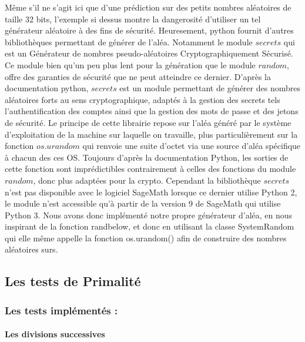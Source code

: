 \documentclass[a4paper,11pt]{article}
\begin{document}
Même s'il ne s'agit ici que d'une prédiction sur des petits nombres aléatoires de taille 32 bits, l'exemple si dessus montre la dangerosité d'utiliser un tel générateur aléatoire à des fins de sécurité. Heuresement, python fournit d'autres bibliothèques permettant de générer de l'aléa. Notamment le module $secrets$ qui est un Générateur de nombres pseudo-aléatoires Cryptographiquement Sécurisé. Ce module bien qu'un peu plus lent pour la génération que le module $random$, offre des garanties de sécurité que ne peut atteindre ce dernier.  
D'après la documentation python, $secrets$ est un module permettant de générer des nombres aléatoires forts au sens cryptographique, adaptés à la gestion des secrets tels l'authentification des comptes ainsi que la gestion des mots de passe et des jetons de sécurité.
Le principe de cette librairie repose sur l'aléa généré par le système d'exploitation de la machine sur laquelle on travaille, plus particulièrement sur la fonction $os.urandom$ qui renvoie une suite d'octet via une source d'aléa spécifique à chacun des ces OS. Toujours d'après la documentation Python, les sorties de cette fonction sont imprédictibles contrairement à celles des fonctions du module $random$, donc plus adaptées pour la crypto. 
Cependant la bibliothèque $secrets$ n'est pas disponible avec le logiciel SageMath lorsque ce dernier utilise Python 2, le module n'est accessible qu'à partir de la version 9 de SageMath qui utilise Python 3.
Nous avons donc implémenté notre propre générateur d'aléa, en nous inspirant de la fonction randbelow, et donc en utilisant la classe SystemRandom qui elle même appelle la fonction os.urandom() afin de construire des nombres aléatoires surs.
 \newline
 




\subsection{Les tests de Primalité}

\subsubsection{Les tests implémentés :}
\paragraph{Les divisions successives} 
\newline
\end{document}
